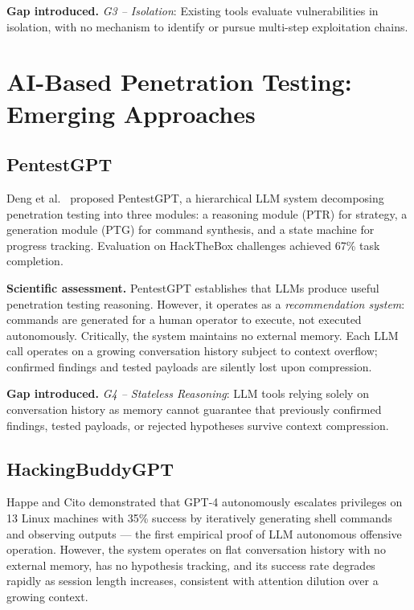 \documentclass[12pt,a4paper,oneside,openany]{book}
\begin{document}
\textbf{Gap introduced.} \textit{G3 -- Isolation}: Existing tools evaluate vulnerabilities in isolation, with no mechanism to identify or pursue multi-step exploitation chains.

\section{AI-Based Penetration Testing: Emerging Approaches}

\subsection{PentestGPT}

Deng et al.\ \cite{deng2024pentestgpt} proposed PentestGPT, a hierarchical LLM system decomposing penetration testing into three modules: a reasoning module (PTR) for strategy, a generation module (PTG) for command synthesis, and a state machine for progress tracking. Evaluation on HackTheBox challenges achieved 67\% task completion.

\textbf{Scientific assessment.} PentestGPT establishes that LLMs produce useful penetration testing reasoning. However, it operates as a \textit{recommendation system}: commands are generated for a human operator to execute, not executed autonomously. Critically, the system maintains no external memory. Each LLM call operates on a growing conversation history subject to context overflow; confirmed findings and tested payloads are silently lost upon compression.

\textbf{Gap introduced.} \textit{G4 -- Stateless Reasoning}: LLM tools relying solely on conversation history as memory cannot guarantee that previously confirmed findings, tested payloads, or rejected hypotheses survive context compression.

\subsection{HackingBuddyGPT}

Happe and Cito \cite{happe2023hackerllm} demonstrated that GPT-4 autonomously escalates privileges on 13 Linux machines with 35\% success by iteratively generating shell commands and observing outputs — the first empirical proof of LLM autonomous offensive operation. However, the system operates on flat conversation history with no external memory, has no hypothesis tracking, and its success rate degrades rapidly as session length increases, consistent with attention dilution over a growing context.
\end{document}
